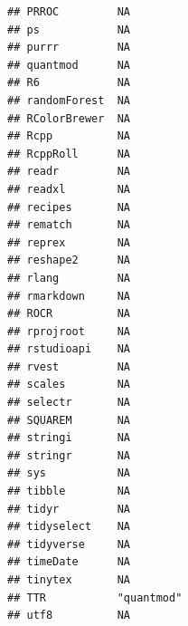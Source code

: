 \documentclass[]{article}
\begin{document}
\begin{verbatim}
## PRROC         NA                                                        
## ps            NA                                                        
## purrr         NA                                                        
## quantmod      NA                                                        
## R6            NA                                                        
## randomForest  NA                                                        
## RColorBrewer  NA                                                        
## Rcpp          NA                                                        
## RcppRoll      NA                                                        
## readr         NA                                                        
## readxl        NA                                                        
## recipes       NA                                                        
## rematch       NA                                                        
## reprex        NA                                                        
## reshape2      NA                                                        
## rlang         NA                                                        
## rmarkdown     NA                                                        
## ROCR          NA                                                        
## rprojroot     NA                                                        
## rstudioapi    NA                                                        
## rvest         NA                                                        
## scales        NA                                                        
## selectr       NA                                                        
## SQUAREM       NA                                                        
## stringi       NA                                                        
## stringr       NA                                                        
## sys           NA                                                        
## tibble        NA                                                        
## tidyr         NA                                                        
## tidyselect    NA                                                        
## tidyverse     NA                                                        
## timeDate      NA                                                        
## tinytex       NA                                                        
## TTR           "quantmod"                                                
## utf8          NA                                                        

\end{verbatim}
\end{document}
